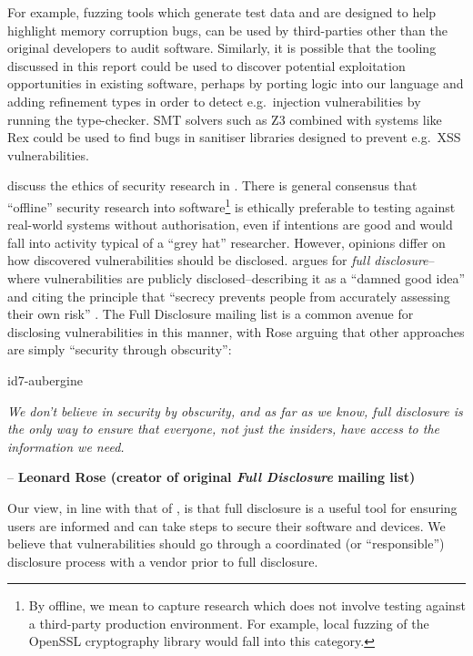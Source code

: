 For example, fuzzing tools which generate test data and are designed to help highlight memory corruption bugs, can be
used by third-parties other than the original developers to audit software.
Similarly, it is possible that the tooling discussed in this report could be used to discover potential exploitation
opportunities in existing software, perhaps by porting logic into our language and adding refinement types in order to
detect e.g.\ injection vulnerabilities by running the type-checker.
SMT solvers such as Z3 combined with systems like Rex could be used to find bugs in sanitiser libraries designed to
prevent e.g.\ XSS vulnerabilities.

\citeauthor{harper2018gray} discuss the ethics of security research in \citet{harper2018gray}.
There is general consensus that ``offline'' security research into software\footnote{By offline, we mean to capture research which does not involve testing against a third-party production environment.
For example, local fuzzing of the OpenSSL cryptography library would fall into this category.} is ethically preferable
to testing against real-world systems without authorisation, even if intentions are good and would fall into activity
typical of a ``grey hat'' researcher.
However, opinions differ on how discovered vulnerabilities should be disclosed. \citeauthor{schneier2007fd} argues for
\textit{full disclosure}--where vulnerabilities are publicly disclosed--describing it as a ``damned good
idea'' and citing the principle that ``secrecy prevents people from accurately assessing their own risk'' \citep{schneier2007fd}.
The Full Disclosure mailing list is a common avenue for disclosing vulnerabilities in this manner, with Rose arguing
that other approaches are simply ``security through obscurity'':

\begin{mdframed}
    \begin{leftbar}{id7-aubergine}
        \vspace{0.25em}

        \textit{We don't believe in security by obscurity, and as far as we know, full disclosure is the only way to ensure that everyone, not just the insiders, have access to the information we need.} \\
        \vspace{0.25em}
    \end{leftbar}
    \vspace{-0.2em}
    \hfill \textcolor{id7-aubergine}{\small \sffamily -- \textbf{Leonard Rose (creator of original \textit{Full Disclosure} mailing list)}}
    \rmfamily
\end{mdframed}

Our view, in line with that of \citeauthor{schneier2007fd}, is that full disclosure is a useful tool for ensuring users
are informed and can take steps to secure their software and devices.
We believe that vulnerabilities should go through a coordinated (or ``responsible'') disclosure process with a vendor
prior to full disclosure.